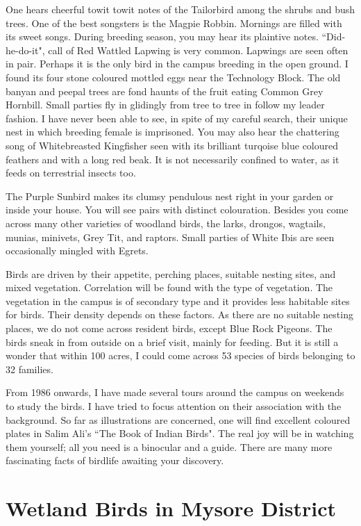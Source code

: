 One hears cheerful towit towit notes of the Tailorbird among the 
shrubs and bush trees. One of the best songsters is the Magpie Robbin. 
Mornings are filled with its sweet songs. During breeding season, you may 
hear its plaintive notes. ``Did-he-do-it", call of Red Wattled Lapwing is very 
common. Lapwings are seen often in pair. Perhaps it is the only bird in the 
campus breeding in the open ground. I found its four stone coloured mottled 
eggs near the Technology Block. The old banyan and peepal trees are fond 
haunts of the fruit eating Common Grey Hornbill. Small parties fly in 
glidingly from tree to tree in follow my leader fashion. I have never been 
able to see, in spite of my careful search, their unique nest in which breeding 
female is imprisoned. You may also hear the chattering song of 
Whitebreasted Kingfisher seen with its brilliant turqoise blue coloured 
feathers and with a long red beak. It is not necessarily confined to water, as 
it feeds on terrestrial insects too. 


The Purple Sunbird makes its clumsy pendulous nest right in your 
garden or inside your house. You will see pairs with distinct colouration. 
Besides you come across many other varieties of woodland birds, the larks, 
drongos, wagtails, munias, minivets, Grey Tit, and raptors. Small parties of 
White Ibis are seen occasionally mingled with Egrets. 


Birds are driven by their appetite, perching places, suitable nesting 
sites, and mixed vegetation. Correlation will be found with the type of vegetation. The vegetation in the campus is of secondary 
type and it provides less habitable sites for birds. Their density depends on 
these factors. As there are no suitable nesting places, we do not come across 
resident birds, except Blue Rock Pigeons. The birds sneak in from outside on a brief visit, 
mainly for feeding. But it is still a wonder that within 100 acres, I could 
come across 53 species of birds belonging to 32 families. 

From 1986 onwards, I have made several tours around the campus on 
weekends to study the birds. I have tried to focus attention on their 
association with the background. So far as illustrations are concerned, one 
will find excellent coloured plates in Salim Ali's ``The Book of Indian 
Birds". The real joy will be in watching them yourself; all you need is a
binocular and a guide. There are many more fascinating facts of birdlife 
awaiting your discovery. 


\chapter{Wetland Birds in Mysore District}%

